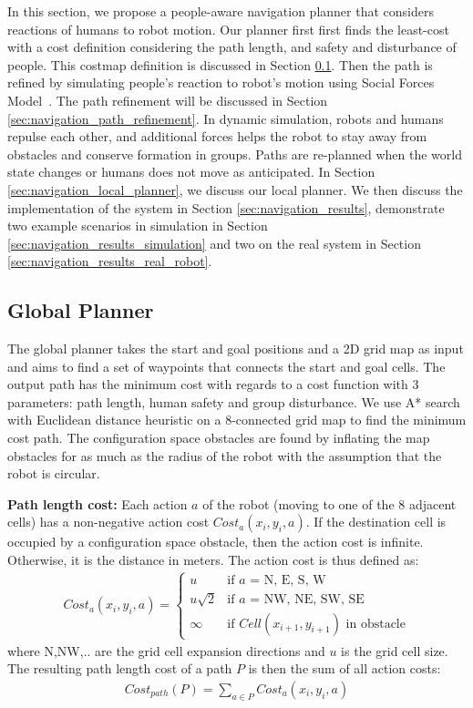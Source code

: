 In this section, we propose a people-aware navigation planner that considers reactions of humans to robot motion. Our planner first first finds the least-cost with a cost definition considering the path length, and safety and disturbance of people. This costmap definition is discussed in Section \ref{sec:navigation_global_planner}. Then the path is refined by simulating people's reaction to robot's motion using Social Forces Model~\cite{helbing1995social}. The path refinement will be discussed in Section \ref{sec:navigation_path_refinement}. In dynamic simulation, robots and humans repulse each other, and additional forces helps the robot to stay away from obstacles and conserve formation in groups. Paths are re-planned when the world state changes or humans does not move as anticipated. In Section \ref{sec:navigation_local_planner}, we discuss our local planner. We then discuss the implementation of the system in Section \ref{sec:navigation_results}, demonstrate two example scenarios in simulation in Section \ref{sec:navigation_results_simulation} and two on the real system in Section \ref{sec:navigation_results_real_robot}.


\subsection{Global Planner}
\label{sec:navigation_global_planner}

The global planner takes the start and goal positions and a 2D grid map as input and aims to find a set of waypoints that connects the start and goal cells. The output path has the minimum cost with regards to a cost function with 3 parameters: path length, human safety and group disturbance. We use A* search with Euclidean distance heuristic on a 8-connected grid map to find the minimum cost path. The configuration space obstacles are found by inflating the map obstacles for as much as the radius of the robot with the assumption that the robot is circular.

\textbf{Path length cost:}  Each action $a$ of the robot (moving to one of the 8 adjacent cells) has a non-negative action cost $Cost_{a}(x_{i},y_{i},a)$. If the destination cell is occupied by a configuration space obstacle, then the action cost is infinite. Otherwise, it is the distance in meters. The action cost is thus defined as:
\begin{align}
Cost_{a}(x_{i},y_{i},a)=\left\{ \begin{array}{cl}
u & \textrm{if $a$ = N, E, S, W}\\
u\sqrt{2} & \textrm{if $a$ = NW, NE, SW, SE}\\
\infty & \textrm{if  $Cell(x_{i+1}, y_{i+1})$ in obstacle} \end{array}\right.
\end{align}
where N,NW,.. are the grid cell expansion directions and $u$ is the grid cell size. The resulting path length cost of a path $P$ is then the sum of all action costs: 
\begin{align}
Cost_{path}(P) = \sum\limits_{a \in P} Cost_{a}(x_{i},y_{i},a)
\end{align}

